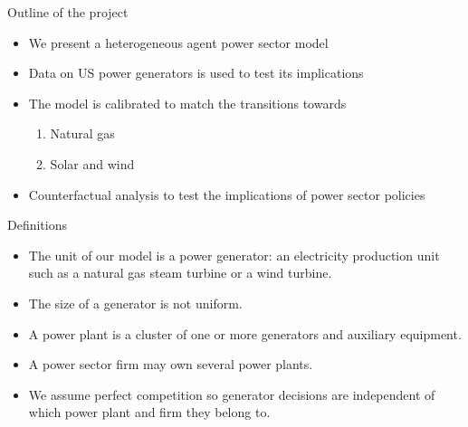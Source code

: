 \documentclass{beamer}
\begin{document}

\begin{frame}{Outline of the project}

\begin{itemize}
    \item We present a heterogeneous agent power sector model
    \item Data on US power generators is used to test its implications
    \item The model is calibrated to match the transitions towards
    \begin{enumerate}
        \item Natural gas
        \item Solar and wind
    \end{enumerate}
    \item Counterfactual analysis to test the implications of power sector policies
\end{itemize}

    
\end{frame}

\begin{frame}{Definitions}

\begin{itemize}
 \item The unit of our model is a power generator: an electricity production unit such as a natural gas steam turbine or a wind turbine.
 \item The size of a generator is not uniform.
 \item A power plant is a cluster of one or more generators and auxiliary equipment.
 \item A power sector firm may own several power plants.
 \item We assume perfect competition so generator decisions are independent of which power plant and firm they belong to.
\end{itemize}
    
\end{frame}
\end{document}
